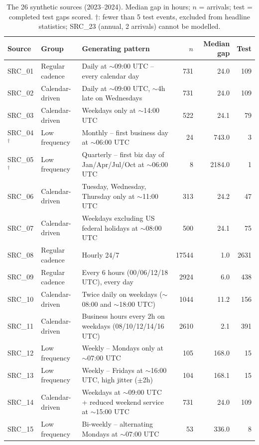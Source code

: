 \begin{table}[t]
\centering\scriptsize
\caption{The 26 synthetic sources (2023--2024). Median gap in hours; $n$ = arrivals; test = completed test gaps scored. $\dagger$: fewer than 5 test events, excluded from headline statistics; SRC\_23 (annual, 2 arrivals) cannot be modelled.}
\label{tab:sources}
\begin{tabular}{llp{9.2cm}rrr}
\toprule
Source & Group & Generating pattern & $n$ & Median gap & Test \\
\midrule
SRC\_01 & Regular cadence & Daily at $\sim$09:00 UTC -- every calendar day & 731 & 24.0 & 109 \\
SRC\_02 & Calendar-driven & Daily at $\sim$09:00 UTC, $\sim$4h late on Wednesdays & 731 & 24.0 & 109 \\
SRC\_03 & Calendar-driven & Weekdays only at $\sim$14:00 UTC & 522 & 24.1 & 79 \\
SRC\_04$^\dagger$ & Low frequency & Monthly -- first business day at $\sim$06:00 UTC & 24 & 743.0 & 3 \\
SRC\_05$^\dagger$ & Low frequency & Quarterly -- first biz day of Jan/Apr/Jul/Oct at $\sim$06:00 UTC & 8 & 2184.0 & 1 \\
SRC\_06 & Calendar-driven & Tuesday, Wednesday, Thursday only at $\sim$11:00 UTC & 313 & 24.2 & 47 \\
SRC\_07 & Calendar-driven & Weekdays excluding US federal holidays at $\sim$08:00 UTC & 500 & 24.1 & 75 \\
SRC\_08 & Regular cadence & Hourly 24/7 & 17544 & 1.0 & 2631 \\
SRC\_09 & Regular cadence & Every 6 hours (00/06/12/18 UTC), every day & 2924 & 6.0 & 438 \\
SRC\_10 & Calendar-driven & Twice daily on weekdays ($\sim$08:00 and $\sim$18:00 UTC) & 1044 & 11.2 & 156 \\
SRC\_11 & Calendar-driven & Business hours every 2h on weekdays (08/10/12/14/16 UTC) & 2610 & 2.1 & 391 \\
SRC\_12 & Low frequency & Weekly -- Mondays only at $\sim$07:00 UTC & 105 & 168.0 & 15 \\
SRC\_13 & Low frequency & Weekly -- Fridays at $\sim$16:00 UTC, high jitter ($\pm$2h) & 104 & 168.1 & 15 \\
SRC\_14 & Calendar-driven & Weekdays at $\sim$09:00 UTC + reduced weekend service at $\sim$15:00 UTC & 731 & 24.0 & 109 \\
SRC\_15 & Low frequency & Bi-weekly -- alternating Mondays at $\sim$07:00 UTC & 53 & 336.0 & 8 \\

\end{tabular}
\end{table}

